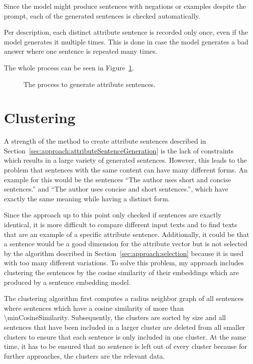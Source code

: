 Since the model might produce sentences with negations or examples despite the prompt, each of the generated sentences is checked automatically.

Per description, each distinct attribute sentence is recorded only once, even if the model generates it multiple times. This is done in case the model generates a bad answer where one sentence is repeated many times.

The whole process can be seen in Figure~\ref{fig:attributeSentenceGeneration}.

\begin{figure}[ht]
  
  \caption{The process to generate attribute sentences.}
  \label{fig:attributeSentenceGeneration}
\end{figure}


\section{Clustering}
\label{sec:approach:clustering}
A strength of the method to create attribute sentences described in Section~\ref{sec:approach:attributeSentenceGeneration} is the lack of constraints which results in a large variety of generated sentences. However, this leads to the problem that sentences with the same content can have many different forms. An example for this would be the sentences \enquote{The author uses short and concise sentences.} and \enquote{The author uses concise and short sentences.}, which have exactly the same meaning while having a distinct form.

Since the approach up to this point only checked if sentences are exactly identical, it is more difficult to compare different input texts and to find texts that are an example of a specific attribute sentence. Additionally, it could be that a sentence would be a good dimension for the attribute vector but is not selected by the algorithm described in Section~\ref{sec:approach:selection} because it is used with too many different variations.
To solve this problem, my approach includes clustering the sentences by the cosine similarity of their embeddings which are produced by a sentence embedding model. %

The clustering algorithm first computes a radius neighbor graph of all sentences where sentences which have a cosine similarity of more than \num{\minCosineSimilarity}. Subsequently, the clusters are sorted by size and all sentences that have been included in a larger cluster are deleted from all smaller clusters to ensure that each sentence is only included in one cluster. At the same time, it has to be ensured that no sentence is left out of every cluster because for further approaches, the clusters are the relevant data.

